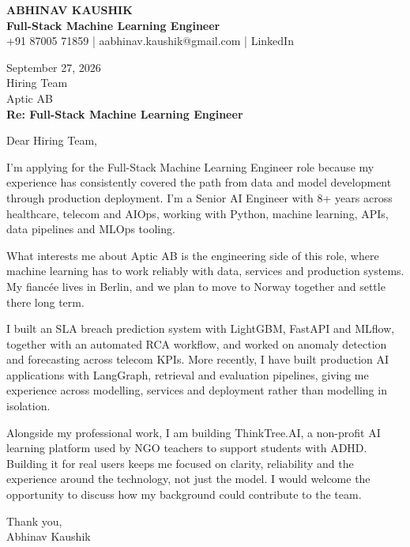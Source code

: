 \documentclass[10pt,a4paper]{article}
\begin{document}
\begin{center}
{\Large\bfseries ABHINAV KAUSHIK}\\[2pt]
{\bfseries Full-Stack Machine Learning Engineer}\\[2pt]
+91 87005 71859 \quad | \quad aabhinav.kaushik@gmail.com \quad | \quad LinkedIn
\end{center}
\vspace{8pt}
September 27, 2026\\[6pt]
Hiring Team\\
Aptic AB\\[4pt]
\textbf{Re: Full-Stack Machine Learning Engineer}

Dear Hiring Team,

I’m applying for the Full-Stack Machine Learning Engineer role because my experience has consistently covered the path from data and model development through production deployment. I’m a Senior AI Engineer with 8+ years across healthcare, telecom and AIOps, working with Python, machine learning, APIs, data pipelines and MLOps tooling.

What interests me about Aptic AB is the engineering side of this role, where machine learning has to work reliably with data, services and production systems. My fiancée lives in Berlin, and we plan to move to Norway together and settle there long term.

I built an SLA breach prediction system with LightGBM, FastAPI and MLflow, together with an automated RCA workflow, and worked on anomaly detection and forecasting across telecom KPIs. More recently, I have built production AI applications with LangGraph, retrieval and evaluation pipelines, giving me experience across modelling, services and deployment rather than modelling in isolation.

Alongside my professional work, I am building ThinkTree.AI, a non-profit AI learning platform used by NGO teachers to support students with ADHD. Building it for real users keeps me focused on clarity, reliability and the experience around the technology, not just the model. I would welcome the opportunity to discuss how my background could contribute to the team.

Thank you,\\
Abhinav Kaushik
\end{document}
